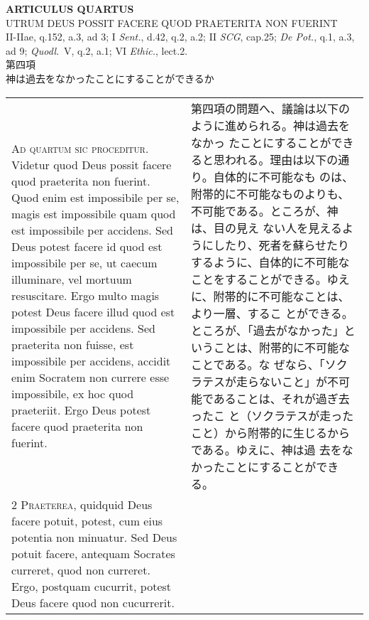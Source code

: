 \documentclass[10pt]{jsarticle} %
\begin{document}
\newpage



\begin{center}
 {\Large {\bf ARTICULUS QUARTUS}}\\
 {\large UTRUM DEUS POSSIT FACERE QUOD PRAETERITA NON FUERINT}\\
 {\footnotesize II-IIae, q.152, a.3, ad 3; I {\itshape Sent.}, d.42,
 q.2, a.2; II {\itshape SCG}, cap.25; {\itshape De Pot.}, q.1, a.3, ad
 9; {\itshape Quodl}.~V, q.2, a.1; VI {\itshape Ethic.}, lect.2. }\\
 {\Large 第四項\\神は過去をなかったことにすることができるか}
\end{center}

\begin{longtable}{p{21em}p{21em}}


{\Huge A}{\scshape d quartum sic proceditur}. Videtur quod Deus possit
facere quod praeterita non fuerint. Quod enim est impossibile per se,
magis est impossibile quam quod est impossibile per accidens. Sed Deus
potest facere id quod est impossibile per se, ut caecum illuminare, vel
mortuum resuscitare. Ergo multo magis potest Deus facere illud quod est
impossibile per accidens. Sed praeterita non fuisse, est impossibile per
accidens, accidit enim Socratem non currere esse impossibile, ex hoc
quod praeteriit. Ergo Deus potest facere quod praeterita non fuerint.

&

第四項の問題へ、議論は以下のように進められる。神は過去をなかっ
たことにすることができると思われる。理由は以下の通り。自体的に不可能なも
のは、附帯的に不可能なものよりも、不可能である。ところが、神は、目の見え
ない人を見えるようにしたり、死者を蘇らせたりするように、自体的に不可能な
ことをすることができる。ゆえに、附帯的に不可能なことは、より一層、するこ
とができる。ところが、「過去がなかった」ということは、附帯的に不可能なことである。な
ぜなら、「ソクラテスが走らないこと」が不可能であることは、それが過ぎ去ったこ
と（ソクラテスが走ったこと）から附帯的に生じるからである。ゆえに、神は過
去をなかったことにすることができる。




\\


{\scshape 2 Praeterea}, quidquid Deus facere potuit,
potest, cum eius potentia non minuatur. Sed Deus potuit facere, antequam
Socrates curreret, quod non curreret. Ergo, postquam cucurrit, potest
Deus facere quod non cucurrerit.



\end{longtable}
\end{document}
